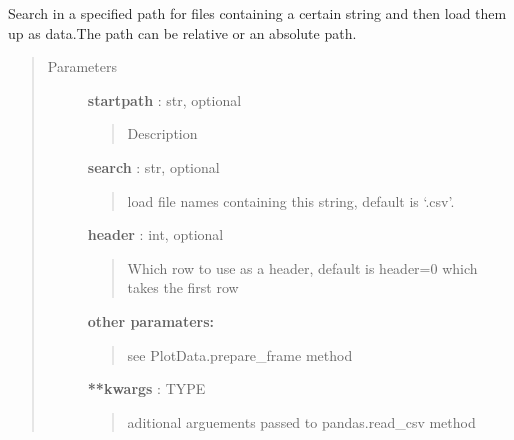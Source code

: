 \documentclass[letterpaper,10pt,english]{sphinxmanual}
\begin{document}
\begin{fulllineitems}
\begin{fulllineitems}
\begin{quote}
\begin{description}
\end{description}\end{quote}

\end{fulllineitems}


\begin{fulllineitems}
\label{pubplots:pubplots.plotdata.PlotData.walkandfind}
Search in a specified path for files containing a certain string and then load them
up as data.The path can be relative or an absolute path.
\begin{quote}\begin{description}
\item[{Parameters}] \leavevmode
\textbf{startpath} : str, optional
\begin{quote}

Description
\end{quote}

\textbf{search} : str, optional
\begin{quote}

load file names containing this string, default is `.csv'.
\end{quote}

\textbf{header} : int, optional
\begin{quote}

Which row to use as a header, default is header=0 which takes the first row
\end{quote}

\textbf{other paramaters:}
\begin{quote}

see PlotData.prepare\_frame method
\end{quote}

\textbf{**kwargs} : TYPE
\begin{quote}

aditional arguements passed to pandas.read\_csv method
\end{quote}

\end{description}\end{quote}

\end{fulllineitems}


\end{fulllineitems}
\end{document}
